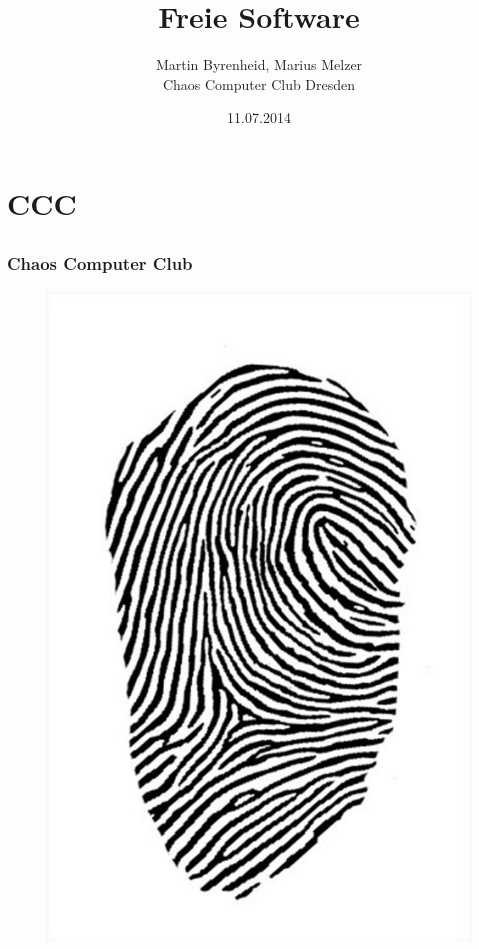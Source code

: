 \documentclass[12pt]{beamer}
\title{Freie Software}
\author{\small Martin Byrenheid, Marius Melzer\\\large Chaos Computer Club Dresden}
\date{11.07.2014}
\begin{document}
\maketitle

\section{CCC}
\subsection{}

\begin{frame}
  \frametitle{Chaos Computer Club}
  \begin{figure}
    \includegraphics[height=0.7\textheight]{img/fingerabdruck.jpg}
  \end{figure}
\end{frame}
\end{document}
